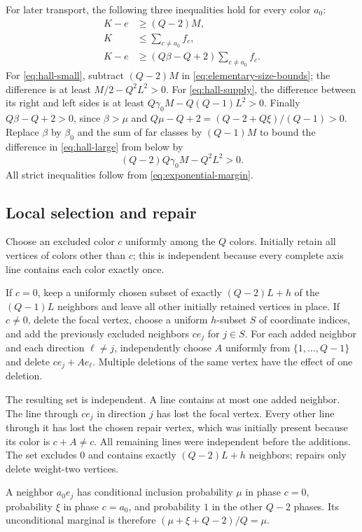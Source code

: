 For later transport, the following three inequalities hold for every
color $a_0$:
\begin{align}
 K-e&\ge (Q-2)M, \label{eq:hall-small}\\
 K&\le\sum_{c\ne a_0}f_c, \label{eq:hall-supply}\\
 K-e&\ge (Q\beta-Q+2)\sum_{c\ne a_0}f_c.
 \label{eq:hall-large}
\end{align}
For \eqref{eq:hall-small}, subtract $(Q-2)M$ in
\eqref{eq:elementary-size-bounds}; the difference is at least
$M/2-Q^2L^2>0$.  For \eqref{eq:hall-supply}, the difference between its
right and left sides is at least
$Q\gamma_0M-Q(Q-1)L^2>0$.  Finally $Q\beta-Q+2>0$, since
$\beta>\mu$ and
$Q\mu-Q+2=(Q-2+Q\xi)/(Q-1)>0$.
Replace $\beta$ by $\beta_0$ and the sum of far classes by $(Q-1)M$ to
bound the difference in \eqref{eq:hall-large} from below by
\[
 (Q-2)Q\gamma_0M-Q^2L^2>0.
\]
All strict inequalities follow from \eqref{eq:exponential-margin}.

\subsection{Local selection and repair}
\label{app:local-repair}

Choose an excluded color $c$ uniformly among the $Q$ colors.  Initially
retain all vertices of colors other than $c$; this is independent because
every complete axis line contains each color exactly once.

If $c=0$, keep a uniformly chosen subset of exactly $(Q-2)L+h$ of the
$(Q-1)L$ neighbors and leave all other initially retained vertices in
place.  If $c\ne0$, delete the focal vertex, choose a uniform $h$-subset
$S$ of coordinate indices, and add the previously excluded neighbors
$c e_j$ for $j\in S$.  For each added neighbor and each direction
$\ell\ne j$, independently choose $A$ uniformly from
$\{1,\ldots,Q-1\}$ and delete $c e_j+A e_\ell$.  Multiple deletions of
the same vertex have the effect of one deletion.

The resulting set is independent.  A line contains at most one added
neighbor.  The line through $c e_j$ in direction $j$ has lost the focal
vertex.  Every other line through it has lost the chosen repair vertex,
which was initially present because its color is $c+A\ne c$.
All remaining lines were independent before the additions.  The set
excludes $0$ and contains exactly $(Q-2)L+h$ neighbors; repairs only
delete weight-two vertices.

A neighbor $a_0e_j$ has conditional inclusion probability $\mu$ in phase
$c=0$, probability $\xi$ in phase $c=a_0$, and probability $1$ in the
other $Q-2$ phases.  Its unconditional marginal is therefore
$(\mu+\xi+Q-2)/Q=\mu$.

